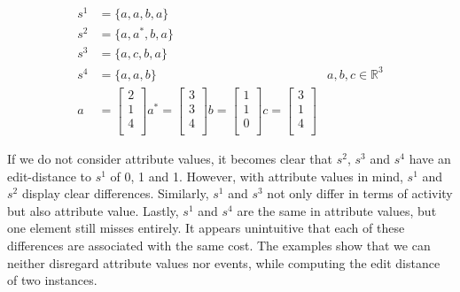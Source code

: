 \documentclass[./../../paper.tex]{subfiles}
\begin{document}
\begin{align}
    \label{eq:dlexample}
    s^1 &=\{a,a,b,a\} \\
    s^2 &=\{a,a^*,b,a\}\\
    s^3 &=\{a,c,b,a\}\\
    s^4 &=\{a,a,b\}
    &a,b,c \in \mathbb{R}^3\\
    a &= \begin{bmatrix}
        2\\
        1\\
        4\\
    \end{bmatrix}
    a^* = \begin{bmatrix}
        3\\
        3\\
        4\\
    \end{bmatrix}
    b = \begin{bmatrix}
        1\\
        1\\
        0\\
    \end{bmatrix}
    c = \begin{bmatrix}
        3\\
        1\\
        4\\
    \end{bmatrix}
\end{align}

\noindent If we do not consider attribute values, it becomes clear that $s^2$, $s^3$ and $s^4$ have an edit-distance to $s^1$ of 0, 1 and 1. However, with attribute values in mind, $s^1$ and $s^2$ display clear differences. Similarly, $s^1$ and $s^3$ not only differ in terms of activity but also attribute value. Lastly, $s^1$ and $s^4$ are the same in attribute values, but one element still misses entirely. It appears unintuitive that each of these differences are associated with the same cost. The examples show that we can neither disregard attribute values nor events, while computing the edit distance of two \glspl{instance}. 
\end{document}
